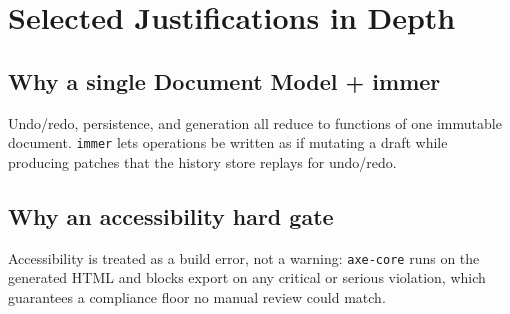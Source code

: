 
\section{Selected Justifications in Depth}
\subsection*{Why a single Document Model + immer}
Undo/redo, persistence, and generation all reduce to functions of one immutable
document. \texttt{immer} lets operations be written as if mutating a draft while
producing patches that the history store replays for undo/redo.

\subsection*{Why an accessibility hard gate}
Accessibility is treated as a build error, not a warning: \texttt{axe-core} runs
on the generated HTML and blocks export on any critical or serious violation,
which guarantees a compliance floor no manual review could match.

